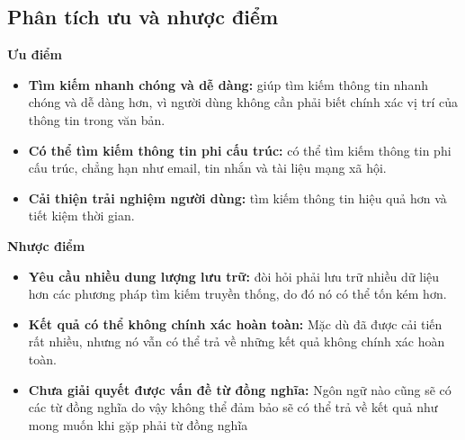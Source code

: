 \subsection{Phân tích ưu và nhược điểm}
\textbf{Ưu điểm}
\begin{itemize}
    \item \textbf{Tìm kiếm nhanh chóng và dễ dàng:} giúp tìm kiếm thông tin nhanh chóng và dễ dàng hơn, vì người dùng không cần phải biết chính xác vị trí của thông tin trong văn bản.
    \item \textbf{Có thể tìm kiếm thông tin phi cấu trúc:} có thể tìm kiếm thông tin phi cấu trúc, chẳng hạn như email, tin nhắn và tài liệu mạng xã hội.
    \item \textbf{Cải thiện trải nghiệm người dùng:} tìm kiếm thông tin hiệu quả hơn và tiết kiệm thời gian.
\end{itemize}
\textbf{Nhược điểm}
\begin{itemize}
    \item \textbf{Yêu cầu nhiều dung lượng lưu trữ:} đòi hỏi phải lưu trữ nhiều dữ liệu hơn các phương pháp tìm kiếm truyền thống, do đó nó có thể tốn kém hơn.
    \item \textbf{Kết quả có thể không chính xác hoàn toàn:} Mặc dù đã được cải tiến rất nhiều, nhưng nó vẫn có thể trả về những kết quả không chính xác hoàn toàn.
    \item \textbf{Chưa giải quyết được vấn đề từ đồng nghĩa:} Ngôn ngữ nào cũng sẽ có các từ đồng nghĩa do vậy không thể đảm bảo sẽ có thể trả về kết quả như mong muốn khi gặp phải từ đồng nghĩa
\end{itemize}